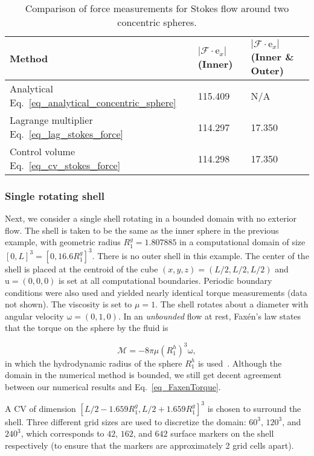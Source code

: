\documentclass[review]{elsarticle}
\renewcommand{\vec}[1]{\bm{\mathrm{#1}}}
\def \u{\vec{u}}
\def \e{\vec{e}}
\def \cM{\vec{\mathcal{M}}}
\def \cF{\vec{\mathcal{F}}}
\def \e{\vec{e}}
\def \u{\vec{u}}
\def \vomega{\vec{\omega}}
\begin{document}
\begin{table}[H]{}
  \caption{Comparison of force measurements
  for Stokes flow around two concentric spheres.}
  \centering
  \begin{tabular}{lll}
    \hline \hline
    Method &  $|\cF \cdot \e_x|$ (Inner) & $|\cF \cdot \e_x|$ (Inner \& Outer)\\ [0.5ex]
    \hline
    Analytical Eq.~\eqref{eq_analytical_concentric_sphere}  &  115.409 & N/A \\
    Lagrange multiplier  Eq.~\eqref{eq_lag_stokes_force}     &  114.297 & 17.350 \\
    Control volume Eq.~\eqref{eq_cv_stokes_force}              &  114.298 & 17.350  \\ [1ex]
    \hline
  \end{tabular}
  \label{table_F_inner_compare}
\end{table}


\subsubsection{Single rotating shell}
Next, we consider a single shell rotating in a bounded domain with no exterior flow.
The shell is taken to be the same as the inner sphere in the previous example, with
geometric radius $R_1^g = 1.807885$ in a computational domain of size $[0,L]^3 = 
[0, 16.6R_1^g]^3$. There is no outer shell in this example. The center of the shell is 
placed at the centroid of the cube $(x,y,z) = (L/2,L/2,L/2)$ and $\u = (0,0,0)$ is set at 
all computational boundaries. Periodic boundary conditions were also used and yielded nearly identical
torque measurements (data not shown). The viscosity is set to $\mu = 1$. The shell rotates about a 
diameter with angular velocity $\vomega = (0,1,0)$. In an \emph{unbounded} flow at rest, 
Fax\'{e}n's law states that the torque on the sphere by the fluid is

\begin{equation}
\cM = -8 \pi \mu (R_1^h)^3 \vomega, \label{eq_FaxenTorque}
\end{equation}
in which the hydrodynamic radius of the sphere $R_1^h$ is used~\cite{Happel65}. Although the domain
in the numerical method is bounded, we still get decent agreement between our numerical results
and Eq.~\eqref{eq_FaxenTorque}.

A CV of dimension $[L/2-1.659R_1^g, L/2+1.659R_1^g]^3$ is chosen to surround the shell.
Three different grid sizes are used to discretize the domain: $60^3$, $120^3$, and $240^3$, which
corresponds to $42$, $162$, and $642$ surface markers on the shell respectively (to ensure that 
the markers are approximately 2 grid cells apart).
\end{document}
